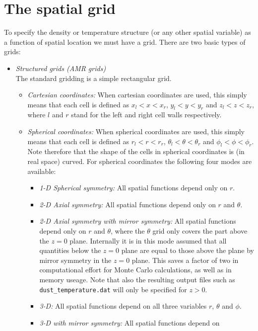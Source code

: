 \documentclass{report}
\begin{document}
\section{The spatial grid}
\label{sec-spatial-grid}
%
To specify the density or temperature structure (or any other spatial 
variable) as a function of spatial location we must have a grid. There
are two basic types of grids:
\begin{itemize}
\item {\em Structured grids (AMR grids)}\\
  The standard gridding is a simple rectangular grid. 
  \begin{itemize}
  \item {\em Cartesian coordinates:} When cartesian coordinates are used,
    this simply means that each cell is defined as $x_l<x<x_r$, $y_l<y<y_r$
    and $z_l<z<z_r$, where $l$ and $r$ stand for the left and right cell
    walls respectively. 
  \item {\em Spherical coordinates:} When spherical coordinates are used,
    this simply means that each cell is defined as $r_l<r<r_r$,
    $\theta_l<\theta<\theta_r$ and $\phi_l<\phi<\phi_r$.  Note therefore
    that the shape of the cells in spherical coordinates is (in real space)
    curved. For spherical coordinates the following four modes are
    available:
    \begin{itemize}
    \item {\em 1-D Spherical symmetry:} All spatial functions depend only on
      $r$.
    \item {\em 2-D Axial symmetry:} All spatial functions depend only on
      $r$ and $\theta$.
    \item {\em 2-D Axial symmetry with mirror symmetry:} All spatial
      functions depend only on $r$ and $\theta$, where the $\theta$ grid
      only covers the part above the $z=0$ plane. Internally it is in this
      mode assumed that all quantities below the $z=0$ plane are equal to
      those above the plane by mirror symmetry in the $z=0$ plane.  This
      saves a factor of two in computational effort for Monte Carlo
      calculations, as well as in memory useage. Note that also the
      resulting output files such as {\small\tt dust\_temperature.dat} will
      only be specified for $z>0$.
    \item {\em 3-D:} All spatial functions depend on all three variables
      $r$, $\theta$ and $\phi$.
    \item {\em 3-D with mirror symmetry:} All spatial functions depend on

\end{itemize}
\end{itemize}
\end{itemize}
\end{document}
